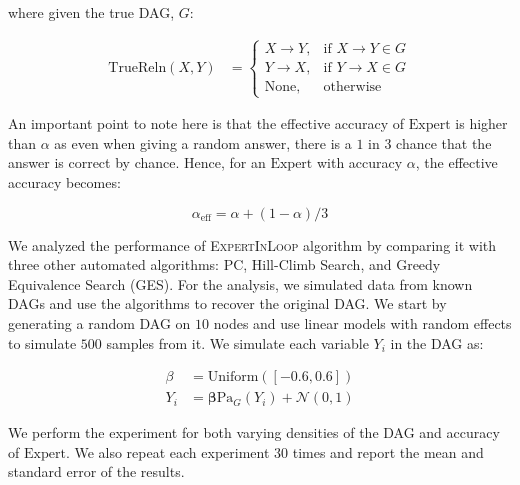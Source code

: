 \documentclass{uai2025} %
\begin{document}
where given the true DAG, $ G $:

\begin{equation}
	\begin{split}
	\mathrm{TrueReln}(X, Y) &= \begin{cases}
					X \rightarrow Y, & \textrm{if } X \rightarrow Y \in G \\
					Y \rightarrow X, & \textrm{if } Y \rightarrow X \in G \\
					\textrm{None}, & \textrm{otherwise }
				  \end{cases}
	\end{split}
\end{equation}

An important point to note here is that the effective accuracy of $
\mathrm{Expert} $ is higher than $ \alpha $ as even when giving a random
answer, there is a $ 1 $ in $ 3 $ chance that the answer is correct by chance.
Hence, for an $ \mathrm{Expert} $ with accuracy $ \alpha $, the effective
accuracy becomes:

\begin{equation}
	\alpha_{\mathrm{eff}} = \alpha + (1 - \alpha) / 3
\end{equation}


We analyzed the performance of \textsc{ExpertInLoop} algorithm by comparing it
with three other automated algorithms: PC, Hill-Climb Search, and Greedy
Equivalence Search (GES). For the analysis, we simulated data from known DAGs
and use the algorithms to recover the original DAG. We start by generating a
random DAG on $10$ nodes and use linear models with random effects to simulate
$ 500 $ samples from it. We simulate each variable $ Y_i $ in the DAG as:


\begin{equation}
	\begin{split}
		\beta &= \mathrm{Uniform}([-0.6, 0.6]) \\
		Y_i &= \bm{\beta} \mathrm{Pa}_G(Y_i) + \mathcal{N}(0, 1)
	\end{split}
\end{equation}

We perform the experiment for both varying densities of the DAG and accuracy of
$\mathrm{Expert}$. We also repeat each experiment $ 30 $ times and report the
mean and standard error of the results.
\end{document}
